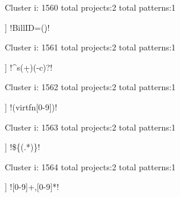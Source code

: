 Cluster i: 1560
total projects:2
total patterns:1
\begin{multicols}{1}
\begin{description}[noitemsep,topsep=0pt]
\item [[2] ] \cverb!BillID=(\d*)!
\end{description}
\end{multicols}







Cluster i: 1561
total projects:2
total patterns:1
\begin{multicols}{1}
\begin{description}[noitemsep,topsep=0pt]
\item [[2] ] \cverb!^s(\d+)(-c)?!
\end{description}
\end{multicols}







Cluster i: 1562
total projects:2
total patterns:1
\begin{multicols}{1}
\begin{description}[noitemsep,topsep=0pt]
\item [[2] ] \cverb!(virtfn[0-9])!
\end{description}
\end{multicols}







Cluster i: 1563
total projects:2
total patterns:1
\begin{multicols}{1}
\begin{description}[noitemsep,topsep=0pt]
\item [[2] ] \cverb!\$\{(.*)\}!
\end{description}
\end{multicols}







Cluster i: 1564
total projects:2
total patterns:1
\begin{multicols}{1}
\begin{description}[noitemsep,topsep=0pt]
\item [[2] ] \cverb![0-9]+,[0-9]*!
\end{description}
\end{multicols}







